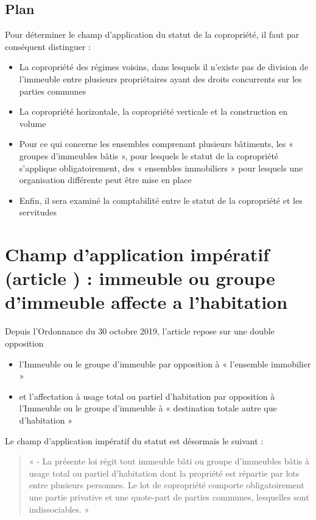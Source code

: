 	\subsection*{Plan}
		Pour déterminer le champ d’application du statut de la copropriété, il faut par conséquent distinguer :
		\begin{itemize}
			\item La copropriété des régimes voisins, dans lesquels il n’existe pas de division de
			l’immeuble entre plusieurs propriétaires ayant des droits concurrents sur les parties
			communes %
			\item La copropriété horizontale, la copropriété verticale et la construction en volume
			\item Pour ce qui concerne les ensembles comprenant plusieurs bâtiments, les « groupes
			d’immeubles bâtis », pour lesquels le statut de la copropriété s’applique
			obligatoirement, des « ensembles immobiliers » pour lesquels une organisation
			différente peut être mise en place %
			\item Enfin, il sera examiné la comptabilité entre le statut de la copropriété et les
			servitudes %
		\end{itemize}

\section[Champ d’application impératif]{Champ d’application impératif (article \II) : immeuble ou groupe d’immeuble affecte a l’habitation}
	Depuis l’Ordonnance du 30 octobre 2019, l’article \I{} repose sur une double opposition
	\begin{itemize}
		\item l’Immeuble ou le groupe d’immeuble par opposition à « l’ensemble immobilier »
		\item et l’affectation à usage total ou partiel d’habitation par opposition à l’Immeuble ou le
		groupe d’immeuble à « destination totale autre que d’habitation »
	\end{itemize}
	
	Le champ d’application impératif du statut est désormais le suivant :
	\begin{quote}
		« \I{} - La présente loi régit tout immeuble bâti ou groupe d’immeubles bâtis à usage total ou partiel
		d’habitation dont la propriété est répartie par lots entre plusieurs personnes.
		Le lot de copropriété comporte obligatoirement une partie privative et une quote-part de parties
		communes, lesquelles sont indissociables. »
	\end{quote}
	
